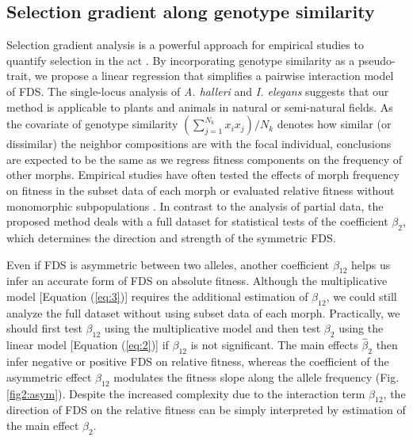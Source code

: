 \documentclass[12pt,]{article}
\begin{document}
\subsection{Selection gradient along genotype similarity}
Selection gradient analysis is a powerful approach for empirical studies to quantify selection in the act \citep{lande1983measurement, mitchell1987regression, chong2018note}. By incorporating genotype similarity as a pseudo-trait, we propose a linear regression that simplifies a pairwise interaction model of FDS. The single-locus analysis of \textit{A. halleri} and \textit{I. elegans} suggests that our method is applicable to plants and animals in natural or semi-natural fields. As the covariate of genotype similarity $(\sum^{N_k}_{j=1}x_i x_j)/N_k$ denotes how similar (or dissimilar) the neighbor compositions are with the focal individual, conclusions are expected to be the same as we regress fitness components on the frequency of other morphs. Empirical studies have often tested the effects of morph frequency on fitness in the subset data of each morph \citep{mccauley1998frequency, bennington1998field, sato2017herbivore} or evaluated relative fitness without monomorphic subpopulations \citep{gigord2001negative, takahashi2010negative}. In contrast to the analysis of partial data, the proposed method deals with a full dataset for statistical tests of the coefficient $\beta_2$, which determines the direction and strength of the symmetric FDS.

Even if FDS is asymmetric between two alleles, another coefficient $\beta_{12}$ helps us infer an accurate form of FDS on absolute fitness. Although the multiplicative model [Equation (\ref{eq:3})] requires the additional estimation of $\beta_{12}$, we could still analyze the full dataset without using subset data of each morph. Practically, we should first test $\beta_{12}$ using the multiplicative model and then test $\beta_2$ using the linear model [Equation (\ref{eq:2})] if $\beta_{12}$ is not significant. The main effects $\hat{\beta}_{2}$ then infer negative or positive FDS on relative fitness, whereas the coefficient of the asymmetric effect $\beta_{12}$ modulates the fitness slope along the allele frequency (Fig. \ref{fig2:asym}). Despite the increased complexity due to the interaction term $\beta_{12}$, the direction of FDS on the relative fitness can be simply interpreted by estimation of the main effect $\beta_2$.
\end{document}
